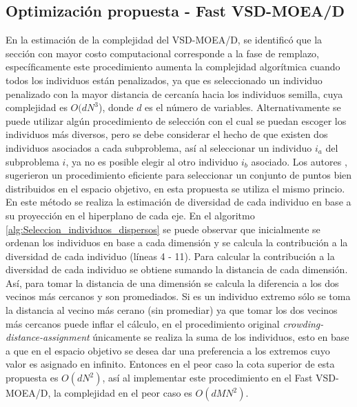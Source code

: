 \subsection{Optimización propuesta - Fast VSD-MOEA/D}

En la estimación de la complejidad del VSD-MOEA/D, se identificó que la sección con mayor costo computacional corresponde a la fase de remplazo, específicamente este procedimiento aumenta la complejidad algorítmica cuando todos los individuos están penalizados, ya que es seleccionado un individuo penalizado con la mayor distancia de cercanía hacia los individuos semilla, cuya complejidad es $O(dN^3$), donde $d$ es el número de variables.
%
Alternativamente se puede utilizar algún procedimiento de selección con el cual se puedan escoger los individuos más diversos, pero se debe considerar el hecho de que existen dos individuos asociados a cada subproblema, así al seleccionar un individuo $i_a$ del subproblema $i$, ya no es posible elegir al otro individuo $i_b$ asociado.
%
Los autores \cite{Joel:Improvement_NSGAII}, sugerieron un procedimiento eficiente para seleccionar un conjunto de puntos bien distribuidos en el espacio objetivo, en esta propuesta se utiliza el mismo princio.
%
En este método se realiza la estimación de diversidad de cada individuo en base a su proyección en el hiperplano de cada eje.
%
En el algoritmo \ref{alg:Seleccion_individuos_dispersos} se puede observar que inicialmente se ordenan los individuos en base a cada dimensión y se calcula la contribución a la diversidad de cada individuo (líneas 4 - 11).
%
Para calcular la contribución a la diversidad de cada individuo se obtiene sumando la distancia de cada dimensión.
%
Así, para tomar la distancia de una dimensión se calcula la diferencia a los dos vecinos más cercanos y son promediados.
%
Si es un individuo extremo sólo se toma la distancia al vecino más cerano (sin promediar) ya que tomar los dos vecinos más cercanos puede inflar el cálculo, en el procedimiento original \textit{crowding-distance-assignment} únicamente se realiza la suma de los individuos, esto en base a que en el espacio objetivo se desea dar una preferencia a los extremos cuyo valor es asignado en infinito.
%
Entonces en el peor caso la cota superior de esta propuesta es $O(dN^2)$, así al implementar este procedimiento en el Fast VSD-MOEA/D, la complejidad en el peor caso es $O(dMN^2)$.

